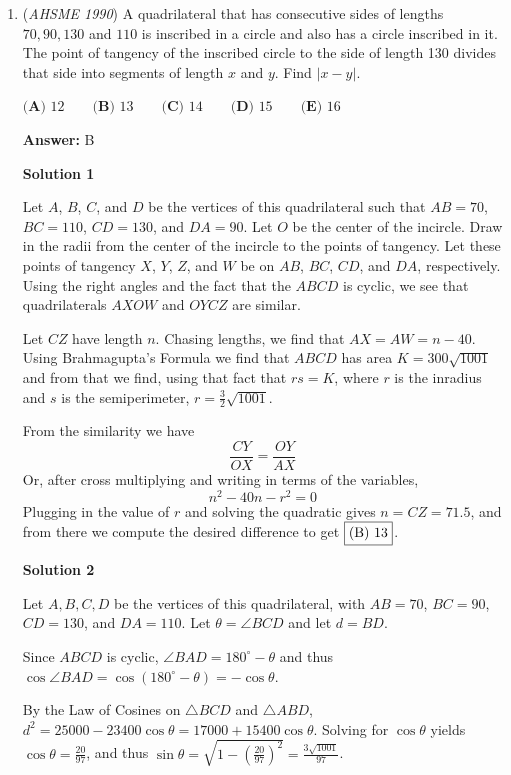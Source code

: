 \begin{enumerate}
 


	\item (\textit{AHSME 1990}) A quadrilateral that has consecutive sides of lengths $70,90,130$ and $110$ is inscribed in a circle and also has a circle inscribed in it. The point of tangency of the inscribed circle to the side of length 130 divides that side into segments of length $x$ and $y$. Find $|x-y|$.


 $\textbf{(A) } 12\qquad \textbf{(B) } 13\qquad \textbf{(C) } 14\qquad \textbf{(D) } 15\qquad \textbf{(E) } 16$

 \textbf{Answer: }B



\textbf{Solution 1}

Let $A$, $B$, $C$, and $D$ be the vertices of this quadrilateral such that $AB=70$, $BC=110$, $CD=130$, and $DA=90$. Let $O$ be the center of the incircle. Draw in the radii from the center of the incircle to the points of tangency. Let these points of tangency $X$, $Y$, $Z$, and $W$ be on $AB$, $BC$, $CD$, and $DA$, respectively. Using the right angles and the fact that the $ABCD$ is cyclic, we see that quadrilaterals $AXOW$ and $OYCZ$ are similar.  

 Let $CZ$ have length $n$. Chasing lengths, we find that $AX=AW=n-40$. Using Brahmagupta's Formula we find that $ABCD$ has area $K=300\sqrt{1001}$ and from that we find, using that fact that $rs=K$, where $r$ is the inradius and $s$ is the semiperimeter, $r=\frac{3}{2}\sqrt{1001}$.

 From the similarity we have
 \[\frac{CY}{OX}=\frac{OY}{AX}\]Or, after cross multiplying and writing in terms of the variables, 
 \[n^2-40n-r^2=0\]Plugging in the value of $r$ and solving the quadratic gives $n=CZ=71.5$, and from there we compute the desired difference to get $\fbox{(B) 13}$.

 



\textbf{Solution 2}

Let $A, B, C, D$ be the vertices of this quadrilateral, with $AB = 70$, $BC = 90$, $CD = 130$, and $DA = 110$.  Let $\theta = \angle BCD$ and let $d = BD$.  

 Since $ABCD$ is cyclic, $\angle BAD = 180^\circ - \theta$ and thus $\cos \angle BAD = \cos(180^\circ - \theta) = -\cos \theta$.

 By the Law of Cosines on $\triangle BCD$ and $\triangle ABD$, $d^2 = 25000 - 23400 \cos \theta = 17000 + 15400 \cos \theta$.  Solving for $\cos \theta$ yields $\cos \theta = \frac{20}{97}$, and thus $\sin \theta = \sqrt{1 - \left(\frac{20}{97}\right)^2} = \frac{3\sqrt{1001}}{97}$.


\end{enumerate}
